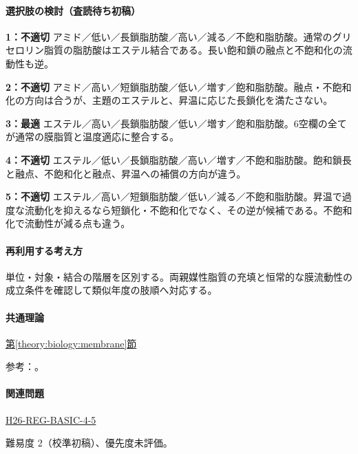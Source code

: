 \paragraph{選択肢の検討（査読待ち初稿）}\mbox{}\par

\noindent\textbf{1：不適切} アミド／低い／長鎖脂肪酸／高い／減る／不飽和脂肪酸。通常のグリセロリン脂質の脂肪酸はエステル結合である。長い飽和鎖の融点と不飽和化の流動性も逆。\par

\noindent\textbf{2：不適切} アミド／高い／短鎖脂肪酸／低い／増す／飽和脂肪酸。融点・不飽和化の方向は合うが、主題のエステルと、昇温に応じた長鎖化を満たさない。\par

\noindent\textbf{3：最適} エステル／高い／長鎖脂肪酸／低い／増す／飽和脂肪酸。6空欄の全てが通常の膜脂質と温度適応に整合する。\par

\noindent\textbf{4：不適切} エステル／低い／長鎖脂肪酸／高い／増す／不飽和脂肪酸。飽和鎖長と融点、不飽和化と融点、昇温への補償の方向が違う。\par

\noindent\textbf{5：不適切} エステル／高い／短鎖脂肪酸／低い／減る／不飽和脂肪酸。昇温で過度な流動化を抑えるなら短鎖化・不飽和化でなく、その逆が候補である。不飽和化で流動性が減る点も違う。\par

\paragraph{再利用する考え方} 単位・対象・結合の階層を区別する。両親媒性脂質の充填と恒常的な膜流動性の成立条件を確認して類似年度の肢順へ対応する。

\paragraph{共通理論} \hyperref[theory:biology:membrane]{第\ref*{theory:biology:membrane}節}

\par 参考：\cite{bio_membrane}。

\paragraph{関連問題} \hyperref[q:h26-reg-basic-4-5]{H26-REG-BASIC-4-5}

\par 難易度 2（校準初稿）、優先度未評価。

